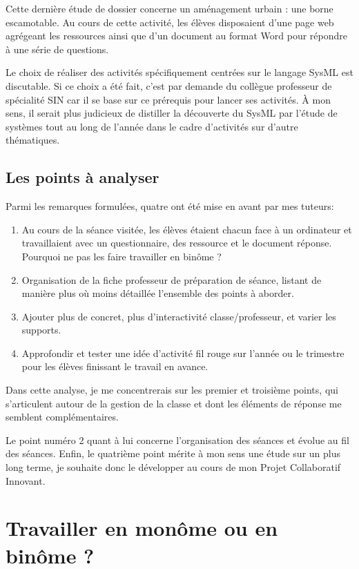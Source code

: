 \documentclass[pdftex,a4paper,12pt]{article}
\begin{document}
	Cette dernière étude de dossier concerne un aménagement urbain : une borne escamotable.
	Au cours de cette activité, les élèves disposaient d'une page web agrégeant les ressources ainsi que
	d'un document au format Word pour répondre à une série de questions. 
	
	Le choix de réaliser des activités spécifiquement centrées sur le langage SysML est discutable. 
	Si ce choix a été fait, c'est par demande du collègue professeur de spécialité SIN car il se base sur ce prérequis pour lancer ses activités.
	À mon sens, il serait plus judicieux de distiller la découverte du SysML par l'étude de systèmes tout au long de l'année 
	dans le cadre d'activités sur d'autre thématiques.

	\subsection{Les points à analyser}
	Parmi les remarques formulées, quatre ont été mise en avant par mes tuteurs:
	\begin{enumerate}
		\item Au cours de la séance visitée, les élèves étaient chacun face à un ordinateur et travaillaient avec un questionnaire, des ressource et le document réponse. 
			Pourquoi ne pas les faire travailler en binôme ?
		\item Organisation de la fiche professeur de préparation de séance, listant de manière plus où moins détaillée l'ensemble des points à aborder.
		\item Ajouter plus de concret, plus d'interactivité classe/professeur, et varier les supports.
		\item Approfondir et tester une idée d'activité \og{}fil rouge\fg{} sur l'année ou le trimestre pour les élèves finissant le travail en avance.
	\end{enumerate}

	Dans cette analyse, je me concentrerais sur les premier et troisième points, qui s'articulent autour de la gestion de la classe 
	et dont les éléments de réponse me semblent complémentaires.

	Le point numéro 2 quant à lui concerne l'organisation des séances et évolue au fil des séances.
	Enfin, le quatrième point mérite à mon sens une étude sur un plus long terme, je souhaite donc le développer au cours de mon \og{}Projet Collaboratif Innovant\fg{}.

	\section{Travailler en monôme ou en binôme ?}
\end{document}
